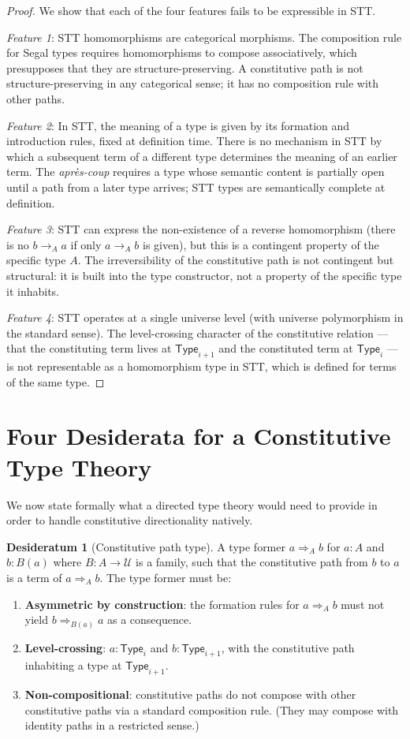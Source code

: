 \documentclass[12pt]{article}
\theoremstyle{definition}
\newtheorem{desideratum}{Desideratum}
\theoremstyle{remark}
\newcommand{\Type}[1]{\mathsf{Type}_{#1}}
\newcommand{\aprescoup}{\textit{apr\`{e}s-coup}}
\newcommand{\consthom}[3]{#2 \Rightarrow_{#1} #3}
\begin{document}
\begin{proof}
We show that each of the four features fails to be expressible in STT.

\textit{Feature 1}: STT homomorphisms are categorical morphisms. The composition rule for Segal types requires homomorphisms to compose associatively, which presupposes that they are structure-preserving. A constitutive path is not structure-preserving in any categorical sense; it has no composition rule with other paths.

\textit{Feature 2}: In STT, the meaning of a type is given by its formation and introduction rules, fixed at definition time. There is no mechanism in STT by which a subsequent term of a different type determines the meaning of an earlier term. The \aprescoup{} requires a type whose semantic content is partially open until a path from a later type arrives; STT types are semantically complete at definition.

\textit{Feature 3}: STT can express the non-existence of a reverse homomorphism (there is no $b \to_A a$ if only $a \to_A b$ is given), but this is a contingent property of the specific type $A$. The irreversibility of the constitutive path is not contingent but structural: it is built into the type constructor, not a property of the specific type it inhabits.

\textit{Feature 4}: STT operates at a single universe level (with universe polymorphism in the standard sense). The level-crossing character of the constitutive relation --- that the constituting term lives at $\Type{i+1}$ and the constituted term at $\Type{i}$ --- is not representable as a homomorphism type in STT, which is defined for terms of the same type.
\end{proof}

\section{Four Desiderata for a Constitutive Type Theory}

We now state formally what a directed type theory would need to provide in order to handle constitutive directionality natively.

\begin{desideratum}[Constitutive path type]
A type former $\consthom{A}{a}{b}$ for $a : A$ and $b : B(a)$ where $B : A \to \mathcal{U}$ is a family, such that the constitutive path from $b$ to $a$ is a term of $\consthom{A}{a}{b}$. The type former must be:
\begin{enumerate}[label=(\alph*)]
\item \textbf{Asymmetric by construction}: the formation rules for $\consthom{A}{a}{b}$ must not yield $\consthom{B(a)}{b}{a}$ as a consequence.
\item \textbf{Level-crossing}: $a : \Type{i}$ and $b : \Type{i+1}$, with the constitutive path inhabiting a type at $\Type{i+1}$.
\item \textbf{Non-compositional}: constitutive paths do not compose with other constitutive paths via a standard composition rule. (They may compose with identity paths in a restricted sense.)
\end{enumerate}
\end{desideratum}
\end{document}
